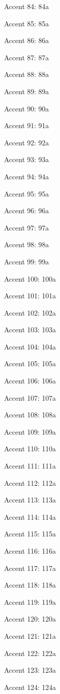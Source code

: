 Accent 84: \accent84a

Accent 85: \accent85a

Accent 86: \accent86a

Accent 87: \accent87a

Accent 88: \accent88a

Accent 89: \accent89a

Accent 90: \accent90a

Accent 91: \accent91a

Accent 92: \accent92a

Accent 93: \accent93a

Accent 94: \accent94a

Accent 95: \accent95a

Accent 96: \accent96a

Accent 97: \accent97a

Accent 98: \accent98a

Accent 99: \accent99a

Accent 100: \accent100a

Accent 101: \accent101a

Accent 102: \accent102a

Accent 103: \accent103a

Accent 104: \accent104a

Accent 105: \accent105a

Accent 106: \accent106a

Accent 107: \accent107a

Accent 108: \accent108a

Accent 109: \accent109a

Accent 110: \accent110a

Accent 111: \accent111a

Accent 112: \accent112a

Accent 113: \accent113a

Accent 114: \accent114a

Accent 115: \accent115a

Accent 116: \accent116a

Accent 117: \accent117a

Accent 118: \accent118a

Accent 119: \accent119a

Accent 120: \accent120a

Accent 121: \accent121a

Accent 122: \accent122a

Accent 123: \accent123a

Accent 124: \accent124a


